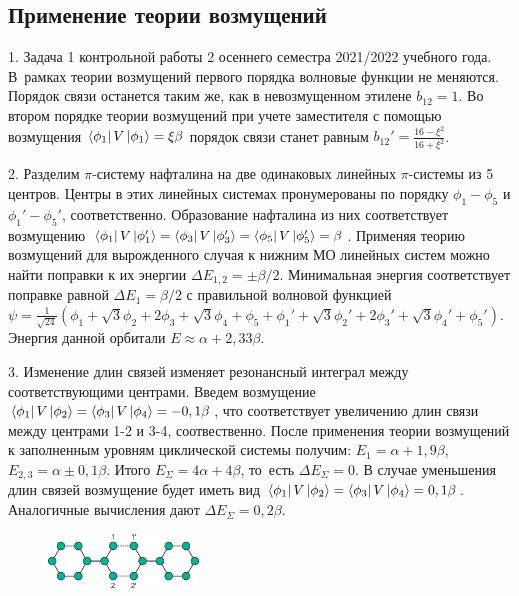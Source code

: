 \subsection{Применение теории возмущений}
1. Задача 1 контрольной работы 2 осеннего семестра 2021/2022 учебного года. В~рамках теории возмущений первого порядка волновые функции не меняются. Порядок связи останется таким же, как в невозмущенном этилене $b_{12}=1$. Во втором порядке теории возмущений при учете заместителя с помощью возмущения $\bra{\phi_1} V \ket{\phi_1}=\xi \beta$ порядок связи станет равным $b_{12}'=\frac{16-\xi ^2}{16+ \xi ^2}$.\par
2. Разделим $\pi$-систему нафталина на две одинаковых линейных $\pi$-системы из 5 центров. Центры в этих линейных системах пронумерованы по порядку $\phi_1 - \phi_5$ и $\phi_1' - \phi_5'$, соответственно. Образование нафталина из них соответствует возмущению $\bra{\phi_1}V \ket{\phi_1'}=\bra{\phi_3} V \ket{\phi_3'}=\bra{\phi_5} V \ket{\phi_5'}=\beta$. Применяя теорию возмущений для вырожденного случая к нижним МО линейных систем можно найти поправки к их энергии $\Delta E_{1,2}= \pm \beta/2 $. Минимальная энергия соответствует поправке равной $\Delta E_1 = \beta/2$ с правильной волновой функцией $\psi=\frac{1}{\sqrt{24}}(\phi_1+\sqrt3\phi_2+2\phi_3+\sqrt3\phi_4+\phi_5+\phi_1'+\sqrt3\phi_2'+2\phi_3'+\sqrt3\phi_4'+\phi_5')$. Энергия данной орбитали $E\approx \alpha+2,33\beta$. \par
3. Изменение длин связей изменяет резонансный интеграл между соответствующими центрами. Введем возмущение $\bra{\phi_1} V \ket{\phi_2}=\bra{\phi_3} V \ket{\phi_4} = -0,1\beta$, что соответствует увеличению длин связи между центрами 1-2 и 3-4, соотвественно. После применения теории возмущений к заполненным уровням циклической системы получим: $E_{1}= \alpha+1,9\beta$, $E_{2,3}=\alpha\pm 0,1\beta$. Итого $E_{\Sigma}=4\alpha+4\beta$, то~есть $\Delta E_{\Sigma}=0$. В случае уменьшения длин связей возмущение будет иметь вид $\bra{\phi_1}V\ket{\phi_2}=\bra{\phi_3}V\ket{\phi_4}=0,1\beta$. Аналогичные вычисления дают $\Delta E_{\Sigma}=0,2\beta$.\par
\begin{figure} %
    \centering
    \vspace{0mm}
    \includegraphics[width=40mm]{images/Fig_1_9_4_dec.png}
    \vspace{-5mm}
\end{figure}

